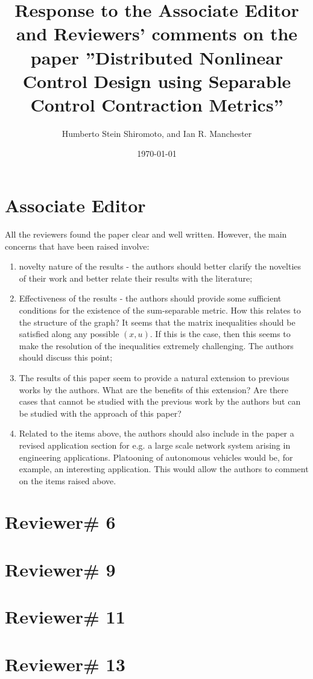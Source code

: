 \documentclass[11pt,a4]{article}
\begin{document}
\title{Response to the Associate Editor and Reviewers' comments on the 
paper ''Distributed Nonlinear Control Design using Separable Control 
Contraction Metrics''}

\author{Humberto Stein Shiromoto, and Ian R. Manchester}

\date{\today}
                                                
\maketitle

\section*{Associate Editor} %
\label{sec:ae}
All the reviewers found the paper clear and well written. However, the
main concerns that have been raised involve:

\begin{enumerate}
	\item novelty nature of the results - the authors should better 
	clarify the novelties of their work and better relate their results 
	with the literature;

	\item Effectiveness of the results - the authors
should provide some sufficient conditions for the existence of the
sum-separable metric. How this relates to the structure of the graph?
It seems that the matrix inequalities should be satisfied along any
possible $(x,u)$. If this is the case, then this seems to make the
resolution of the inequalities extremely challenging. The authors
should discuss this point;

	\item The results of this paper seem to provide a natural extension to
previous works by the authors. What are the benefits of this extension?
Are there cases that cannot be studied with the previous work by the
authors but can be studied with the approach of this paper? 

\item Related to the items above, the authors should also include in the
paper a revised application section for e.g. a large scale network
system arising in engineering applications. Platooning of autonomous
vehicles would be, for example, an interesting application. This would
allow the authors to comment on the items raised above.
\end{enumerate}

\section{Reviewer\# 6}\label{r:6}

\section{Reviewer\# 9}\label{r:9}

\section{Reviewer\# 11}\label{r:11}

\section{Reviewer\# 13}\label{r:13}

\printbibliography
\end{document}
